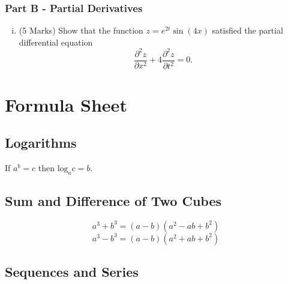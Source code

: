 ﻿ \documentclass[a4paper,12pt]{article}
\begin{document}
\bigskip
\subsubsection*{Part B - Partial Derivatives}
\begin{enumerate}[(i)]

 \item (5 Marks)
 Show that the function $z=e^{2t}\sin(4x)$ satisfied the partial differential equation
 \[ \frac{\partial^2 z}{\partial x^2} +  4\frac{\partial^2 z}{\partial t^2} = 0. \]
\end{enumerate}
%
%	
%
%
%

\newpage
	
	\section*{Formula Sheet}
	
	\subsection*{Logarithms}
	If $a^b = c$ then $\mbox{log}_a c = b$.
	\subsection*{Sum and Difference of Two Cubes}
	\[ a^3 + b^3 = (a-b)(a^2 - ab + b^2)\]
	\[ a^3 - b^3 = (a-b)(a^2 + ab + b^2)\]
	
	
	\subsection*{Sequences and Series}
	
\end{document}
